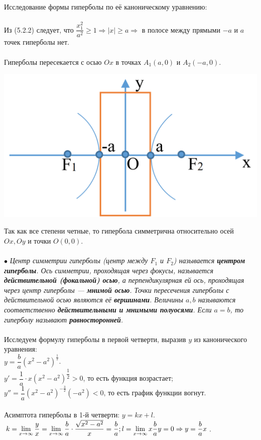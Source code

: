Исследование формы гиперболы по её каноническому уравнению:\\\\
Из (5.2.2) следует, что $\dfrac{x_1^2}{a^2} \geqslant 1 \Rightarrow |x| \geqslant a \Rightarrow$ в полосе между прямыми $-a$ и $a$ точек гиперболы нет.\\\\
Гиперболы пересекается с осью $Ox$ в точках $A_1(a, 0)$ и $A_2(-a, 0)$.
\begin{center}
	\includegraphics[scale=0.4]{images/gip2.png}
\end{center}
Так как все степени четные, то гипербола симметрична относительно осей $Ox, Oy$ и точки $O(0, 0)$. \\\\
$\bullet$ \textit{Центр симметрии
	гиперболы (центр между $F_1$ и $F_2$) называется \textbf{центром гиперболы}. Ось симметрии, проходящая
	через фокусы, называется \textbf{действительной (фокальной) осью}, а перпендикулярная ей ось,
	проходящая через центр гиперболы --- \textbf{мнимой осью}. Точки пересечения гиперболы с действительной
	осью являются её \textbf{вершинами}. Величины $a, b$ называются соответственно \textbf{действительными и
		мнимыми полуосями}. Если $a = b$, то гиперболу называют \textbf{равносторонней}.}\\\\
Исследуем формулу гиперболы в первой четверти, выразив $y$ из канонического уравнения:\\
$y= \dfrac{b}{a}(x^2 - a^2)^{\frac{1}{2}}$. \\$y' = \dfrac{1}{a}\cdot x(x^2 - a^2)^{\dfrac{1}{2}} > 0$, то есть функция возрастает;\\
$y'' = \dfrac{1}{a}(x^2 - a^2)^{-\frac{3}{2}}(-a^2) < 0$, то есть график функции вогнут.\\\\
Асимптота гиперболы в 1-й четверти: $y = kx + l$.\\ $k = \lim\limits_{x \to \infty}\dfrac{y}{x} = \lim\limits_{x \to \infty} \dfrac{b}{a}\cdot \dfrac{\sqrt{x^2 - a^2}}{x} = \dfrac{b}{a};\\ l = \lim\limits_{x \to \infty}x\dfrac{b}{a}y = 0 \Rightarrow y = \dfrac{b}{a}x$.

